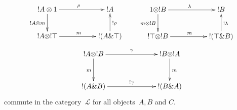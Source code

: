 \documentclass[runningheads,a4paper]{llncs}
\newcommand{\with}{\&}
\newcommand{\tensor}{\otimes}
\newcommand{\lax}{m}
\newcommand{\LAT}{\mathscr{L}}
\begin{document}
\begin{equation}\label{equation/diagram-of-seely-three}
\begin{array}{ccc}
\vcenter{\xymatrix @-.1pc {
!A\tensor 1
\ar[rr]^{\rho}
\ar[d]_{!A\tensor \lax}
&&
!A\\
!A\tensor !\top\ar[rr]^{\lax}
&&
!(A\with\top)\ar[u]_{!\rho}}}
&&
\vcenter{\xymatrix @-.1pc {
1\tensor !B\ar[rr]^{\lambda}\ar[d]_{\lax\tensor !B} && !B\\
!\top\tensor !B\ar[rr]^{\lax}&&!(\top\with B)\ar[u]_{!\lambda}}}
\end{array}
\end{equation}
\begin{equation}\label{equation/diagram-of-seely-four}
\vcenter{
\xymatrix @+.6pc {
  !A\tensor !B\ar[rr]^{\gamma} \ar[d]_{\lax}
&& 
  !B\tensor !A\ar[d]^{\lax}
\\
  !(A\with B)\ar[rr]^{!\gamma}
&& 
  !(B\with A)
}}
\end{equation}
commute in the category~$\LAT$ for all objects~$A,B$ and $C$.
\end{document}
